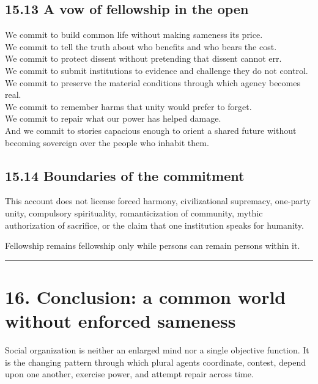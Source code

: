 \documentclass[
  11pt,
]{article}
\begin{document}
\subsection{15.13 A vow of fellowship in the
open}\label{a-vow-of-fellowship-in-the-open}

We commit to build common life without making sameness its price.\\
We commit to tell the truth about who benefits and who bears the cost.\\
We commit to protect dissent without pretending that dissent cannot
err.\\
We commit to submit institutions to evidence and challenge they do not
control.\\
We commit to preserve the material conditions through which agency
becomes real.\\
We commit to remember harms that unity would prefer to forget.\\
We commit to repair what our power has helped damage.\\
And we commit to stories capacious enough to orient a shared future
without becoming sovereign over the people who inhabit them.

\subsection{15.14 Boundaries of the
commitment}\label{boundaries-of-the-commitment}

This account does not license forced harmony, civilizational supremacy,
one-party unity, compulsory spirituality, romanticization of community,
mythic authorization of sacrifice, or the claim that one institution
speaks for humanity.

Fellowship remains fellowship only while persons can remain persons
within it.

\begin{center}\rule{0.5\linewidth}{0.5pt}\end{center}

\section{16. Conclusion: a common world without enforced
sameness}\label{conclusion-a-common-world-without-enforced-sameness}

Social organization is neither an enlarged mind nor a single objective
function. It is the changing pattern through which plural agents
coordinate, contest, depend upon one another, exercise power, and
attempt repair across time.
\end{document}
